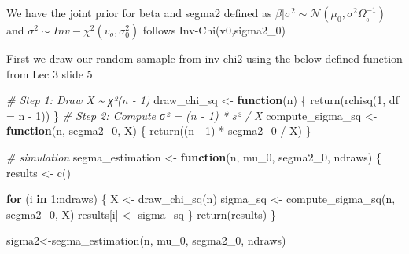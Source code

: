 \documentclass[
]{article}
\newenvironment{Shaded}{\begin{snugshade}}{\end{snugshade}}
\newcommand{\AttributeTok}[1]{\textcolor[rgb]{0.77,0.63,0.00}{#1}}
\newcommand{\CommentTok}[1]{\textcolor[rgb]{0.56,0.35,0.01}{\textit{#1}}}
\newcommand{\ControlFlowTok}[1]{\textcolor[rgb]{0.13,0.29,0.53}{\textbf{#1}}}
\newcommand{\DecValTok}[1]{\textcolor[rgb]{0.00,0.00,0.81}{#1}}
\newcommand{\FloatTok}[1]{\textcolor[rgb]{0.00,0.00,0.81}{#1}}
\newcommand{\FunctionTok}[1]{\textcolor[rgb]{0.00,0.00,0.00}{#1}}
\newcommand{\NormalTok}[1]{#1}
\newcommand{\OtherTok}[1]{\textcolor[rgb]{0.56,0.35,0.01}{#1}}
\newcommand{\SpecialCharTok}[1]{\textcolor[rgb]{0.00,0.00,0.00}{#1}}
\begin{document}
\begin{Shaded}
\end{Shaded}

We have the joint prior for beta and segma2 defined as
\(\beta|\sigma^2\sim\mathcal{N}(\mu_0,\sigma^2\Omega_{_0}^{-1})\) and
\(\sigma^2 \sim Inv-\chi^2(v_o,\sigma^2_0)\) follows
Inv-Chi(v0,sigma2\_0)

First we draw our random samaple from inv-chi2 using the below defined
function from Lec 3 slide 5

\begin{Shaded}
\begin{Highlighting}[]
\CommentTok{\# Step 1: Draw X \textasciitilde{} χ²(n {-} 1)}
\NormalTok{draw\_chi\_sq }\OtherTok{\textless{}{-}} \ControlFlowTok{function}\NormalTok{(n) \{}
  \FunctionTok{return}\NormalTok{(}\FunctionTok{rchisq}\NormalTok{(}\DecValTok{1}\NormalTok{, }\AttributeTok{df =}\NormalTok{ n }\SpecialCharTok{{-}} \DecValTok{1}\NormalTok{))}
\NormalTok{\}}
\CommentTok{\# Step 2: Compute σ² = (n {-} 1) * s² / X}
\NormalTok{compute\_sigma\_sq }\OtherTok{\textless{}{-}} \ControlFlowTok{function}\NormalTok{(n, segma2\_0, X) \{}
  \FunctionTok{return}\NormalTok{((n }\SpecialCharTok{{-}} \DecValTok{1}\NormalTok{) }\SpecialCharTok{*}\NormalTok{ segma2\_0 }\SpecialCharTok{/}\NormalTok{ X)}
\NormalTok{\}}

\CommentTok{\# simulation}
\NormalTok{segma\_estimation }\OtherTok{\textless{}{-}} \ControlFlowTok{function}\NormalTok{(n, mu\_0, segma2\_0, ndraws) \{}
\NormalTok{  results }\OtherTok{\textless{}{-}} \FunctionTok{c}\NormalTok{()}
  
  \ControlFlowTok{for}\NormalTok{ (i }\ControlFlowTok{in} \DecValTok{1}\SpecialCharTok{:}\NormalTok{ndraws) \{}
\NormalTok{    X }\OtherTok{\textless{}{-}} \FunctionTok{draw\_chi\_sq}\NormalTok{(n)}
\NormalTok{    sigma\_sq }\OtherTok{\textless{}{-}} \FunctionTok{compute\_sigma\_sq}\NormalTok{(n, segma2\_0, X)}
\NormalTok{    results[i] }\OtherTok{\textless{}{-}}\NormalTok{ sigma\_sq}
\NormalTok{  \}}
  \FunctionTok{return}\NormalTok{(results)}
\NormalTok{\}}

\NormalTok{sigma2}\OtherTok{\textless{}{-}}\FunctionTok{segma\_estimation}\NormalTok{(n, mu\_0, segma2\_0, ndraws)}
\end{Highlighting}
\end{Shaded}
\end{document}
